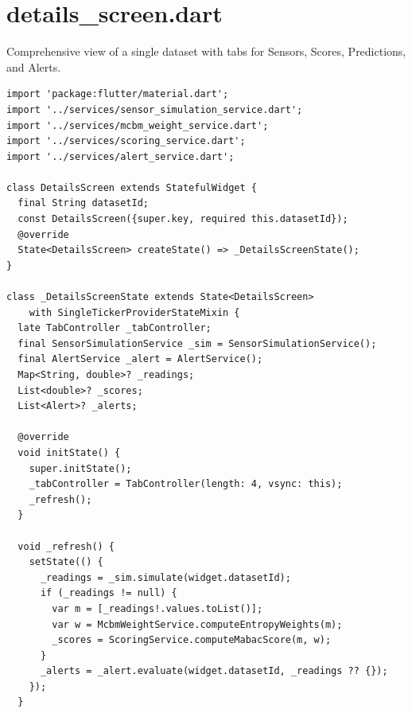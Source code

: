 \documentclass[12pt,a4paper,oneside]{report}
\begin{document}
\section{details\_screen.dart}

Comprehensive view of a single dataset with tabs for Sensors, Scores, Predictions, and Alerts.

\begin{lstlisting}[style=dartstyle]
import 'package:flutter/material.dart';
import '../services/sensor_simulation_service.dart';
import '../services/mcbm_weight_service.dart';
import '../services/scoring_service.dart';
import '../services/alert_service.dart';

class DetailsScreen extends StatefulWidget {
  final String datasetId;
  const DetailsScreen({super.key, required this.datasetId});
  @override
  State<DetailsScreen> createState() => _DetailsScreenState();
}

class _DetailsScreenState extends State<DetailsScreen>
    with SingleTickerProviderStateMixin {
  late TabController _tabController;
  final SensorSimulationService _sim = SensorSimulationService();
  final AlertService _alert = AlertService();
  Map<String, double>? _readings;
  List<double>? _scores;
  List<Alert>? _alerts;

  @override
  void initState() {
    super.initState();
    _tabController = TabController(length: 4, vsync: this);
    _refresh();
  }

  void _refresh() {
    setState(() {
      _readings = _sim.simulate(widget.datasetId);
      if (_readings != null) {
        var m = [_readings!.values.toList()];
        var w = McbmWeightService.computeEntropyWeights(m);
        _scores = ScoringService.computeMabacScore(m, w);
      }
      _alerts = _alert.evaluate(widget.datasetId, _readings ?? {});
    });
  }


\end{lstlisting}
\end{document}
